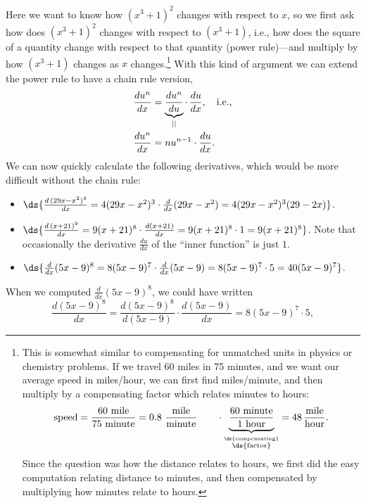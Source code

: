 Here we want to know how $(x^3+1)^2$ changes with respect to
$x$, so we first ask how does $(x^3+1)^2$ changes
with respect to $(x^3+1)$, i.e.,  how does the square
of a quantity change with respect to that 
quantity (power rule)---and 
multiply by how $(x^3+1)$ changes as $x$ changes.\footnote{%
This is somewhat similar to compensating for unmatched units in physics or
chemistry problems.  If we travel 60 miles in 75 minutes, and
we want our average speed in miles/hour, we can first find miles/minute,
and then multiply by a compensating factor which relates minutes
to hours:
$$\text{speed}=\frac{60\text{ mile}}{75\text{ minute}}
              =0.8\ \frac{\text{mile}}{\text{minute}}
                 \qquad\cdot\underbrace{\frac{60\text{ minute}}
                     {1\text{ hour}}}_{%
                  \overset{\ds{\text{compensating}}}{\ds{\text{factor}}}}
              =48\,\frac{\text{mile}}{\text{hour}}.$$
Since the question was how the distance relates to hours, we first
did the easy computation relating distance to minutes, and 
then compensated by multiplying how minutes relate to hours.
}%
\hphantom{. }%
With this kind of argument we can extend the power rule 
to have a chain rule version,
\begin{align}
\frac{du^n}{dx}&=\underbrace{\frac{du^n}{du}}_{||}\cdot\,\frac{du}{dx},\quad
                     \text{i.e.,}\notag\\
\frac{du^n}{dx}&=nu^{n-1}\cdot\frac{du}{dx}.\label{PowerRuleWithChainRule}
\end{align}%
\bex We can now quickly calculate the following 
derivatives, which would be more difficult without the chain rule:
\begin{itemize}
\item $\ds{\frac{d\,(29x-x^2)^4}{dx}
=4(29x-x^2)^3\cdot\frac{d}{dx}(29x-x^2)
=4(29x-x^2)^3(29-2x)}$.
\item $\ds{\frac{d\,(x+21)^9}{dx}=9(x+21)^8\cdot\frac{d(x+21)}{dx}
           =9(x+21)^8\cdot 1=9(x+21)^8}$. Note that 
occasionally the derivative $\frac{du}{dx}$ 
of the ``inner function'' is just $1$.
\item $\ds{\frac{d}{dx}(5x-9)^8=8(5x-9)^7\cdot\frac{d}{dx}(5x-9)
=8(5x-9)^7\cdot5=40(5x-9)^7}$.

\end{itemize}
\eex
%
When we computed $\frac{d}{dx}(5x-9)^8$, we could have written
\begin{equation}
\frac{d(5x-9)^8}{dx}=\frac{d(5x-9)^8}{d(5x-9)}\cdot\frac{d(5x-9)}{dx}
=8(5x-9)^7\cdot5,\label{ExampleForExpandedStyleOnChainRulesW/Powers}
\end{equation}
